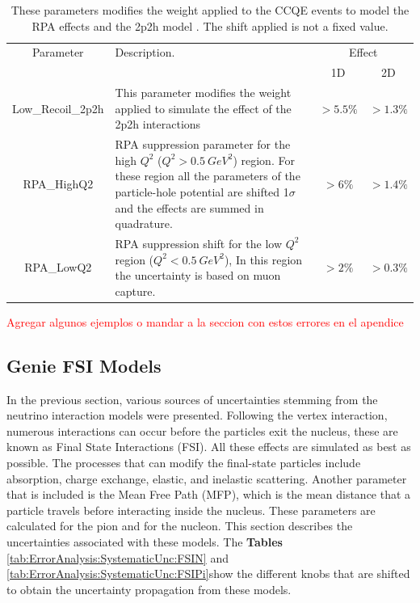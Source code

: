 \begin{table}[!htb]
    \centering
    \begin{tabular}{c|p{2in}|c|c}
        \hline 
        Parameter & Description.  & \multicolumn{2}{c}{Effect} \\
         & & 1D & 2D \\
        \hline  
        Low\_Recoil\_2p2h & This parameter modifies the weight applied to simulate the effect of the 2p2h interactions & $>5.5\%$ & $>1.3\%$ \\ \hline
        RPA\_HighQ2 & RPA suppression parameter for the high $Q^2$ ($Q^2 > 0.5\ GeV^2$) region. For these region all the parameters of the particle-hole potential are shifted 1$\sigma$ and the effects are summed in quadrature. & $>6\%$ & $>1.4\%$ \\ \hline
        RPA\_LowQ2 & RPA suppression shift for the low $Q^2$ region ($Q^2 < 0.5\ GeV^2$), In this region the uncertainty is based on muon capture. & $>2\%$ & $>0.3\%$ \\ \hline 
    \end{tabular}
    \caption{These parameters modifies the weight applied to the CCQE events to model the RPA effects \cite{RPAgran2017model} and the 2p2h model \cite{2p2hRodrigues_2016}. The shift applied is not a fixed value.}
    \label{tab:ErrorAnalysis:SystematicUnc:MnvTune}
\end{table}

\textcolor{red}{Agregar algunos ejemplos o mandar a la seccion con estos errores en el apendice}

\pagebreak
\subsection{Genie FSI Models}
\label{Cap:ErrorAnalysis:SystematicUnc:GenieFSINucleons}
In the previous section, various sources of uncertainties stemming from the neutrino interaction models were presented. Following the vertex interaction, numerous interactions can occur before the particles exit the nucleus, these are known as Final State Interactions (FSI). All these effects are simulated as best as possible. The processes that can modify the final-state particles include absorption, charge exchange, elastic, and inelastic scattering. Another parameter that is included is the Mean Free Path (MFP), which is the mean distance that a particle travels before interacting inside the nucleus. These parameters are calculated for the pion and for the nucleon. This section describes the uncertainties associated with these models. The \textbf{Tables} \ref{tab:ErrorAnalysis:SystematicUnc:FSIN} and \ref{tab:ErrorAnalysis:SystematicUnc:FSIPi}show the different knobs that are shifted to obtain the uncertainty propagation from these models. 

